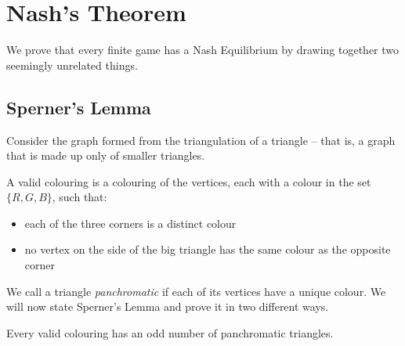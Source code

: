 \section{Nash's Theorem}

We prove that every finite game has a Nash Equilibrium by drawing together two
seemingly unrelated things.

\subsection{Sperner's Lemma}

Consider the graph formed from the triangulation of a triangle -- that is, a
graph that is made up only of smaller triangles.

\begin{definition}
	A valid colouring is a colouring of the vertices, each with a colour in
	the set $\{R,G,B\}$, such that:
	\begin{itemize}
		\item each of the three corners is a distinct colour
		\item no vertex on the side of the big triangle has the same colour
			as the opposite corner
	\end{itemize}
\end{definition}

We call a triangle \textit{panchromatic} if each of its vertices have a unique
colour. We will now state Sperner's Lemma and prove it in two different ways.

\begin{theorem}
	Every valid colouring has an odd number of panchromatic triangles.
\end{theorem}

